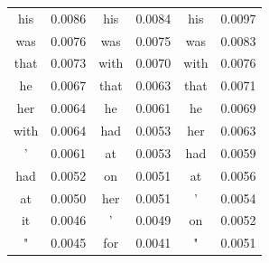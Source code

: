 \documentclass[12pt]{article} \usepackage{COSC420style} \usepackage{soul}
\begin{document}
\begin{table}[htbp]
\begin{tabular}{cccccc}
		his                                       & 0.0086                                    & his                                       & 0.0084      & his              & 0.0097      \\
		was                                       & 0.0076                                    & was                                       & 0.0075      & was              & 0.0083      \\
		that                                      & 0.0073                                    & with                                      & 0.0070      & with             & 0.0076      \\
		he                                        & 0.0067                                    & that                                      & 0.0063      & that             & 0.0071      \\
		her                                       & 0.0064                                    & he                                        & 0.0061      & he               & 0.0069      \\
		with                                      & 0.0064                                    & had                                       & 0.0053      & her              & 0.0063      \\
		'                                         & 0.0061                                    & at                                        & 0.0053      & had              & 0.0059      \\
		had                                       & 0.0052                                    & on                                        & 0.0051      & at               & 0.0056      \\
		at                                        & 0.0050                                    & her                                       & 0.0051      & '                & 0.0054      \\
		it                                        & 0.0046                                    & '                                         & 0.0049      & on               & 0.0052      \\
		"                                         & 0.0045                                    & for                                       & 0.0041      & "                & 0.0051      \\
		\bottomrule
	\end{tabular}
\end{table}
\end{document}
